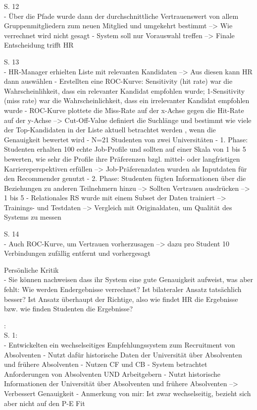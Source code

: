 S. 12\\
- Über die Pfade wurde dann der durchschnittliche Vertrauenswert von allem Gruppenmitgliedern zum neuen Mitglied und umgekehrt bestimmt --> Wie verrechnet wird nicht gesagt
- System soll nur Vorauswahl treffen --> Finale Entscheidung trifft HR

S. 13\\
- HR-Manager erhielten Liste mit relevanten Kandidaten --> Aus diesen kann HR dann auswählen
- Erstellten eine ROC-Kurve: Sensitivity (hit rate) war die Wahrscheinlihkeit, dass ein relevanter Kandidat empfohlen wurde; 1-Sensitivity (miss rate) war die Wahrscheinlichkeit, dass ein irrelevanter Kandidat empfohlen wurde
- ROC-Kurve plottete die Miss-Rate auf der x-Achse gegen die Hit-Rate auf der y-Achse --> Cut-Off-Value definiert die Suchlänge und bestimmt wie viele der Top-Kandidaten in der Liste aktuell betrachtet werden , wenn die Genauigkeit bewertet wird
- N=21 Studenten von zwei Universitäten
- 1. Phase: Studenten erhalten 100 echte Job-Profile und sollten auf einer Skala von 1 bis 5 bewerten, wie sehr die Profile ihre Präferenzen bzgl. mittel- oder langfristigen Karriereperspektiven erfüllen --> Job-Präferenzdaten wurden als Inputdaten für den Recommender genutzt
- 2. Phase: Studenten fügten Informationen über die Beziehungen zu anderen Teilnehmern hinzu --> Sollten Vertrauen ausdrücken --> 1 bis 5
- Relationales RS wurde mit einem Subset der Daten trainiert --> Trainings- und Testdaten --> Vergleich mit Originaldaten, um Qualität des Systems zu messen

S. 14\\
- Auch ROC-Kurve, um Vertrauen vorherzusagen --> dazu pro Student 10 Verbindungen zufällig entfernt und vorhergesagt

Persönliche Kritik\\
- Sie können nachweisen dass ihr System eine gute Genauigkeit aufweist, was aber fehlt: Wie werden Endergebnisse verrechnet? Ist bilateraler Ansatz tatsächlich besser? Ist Ansatz überhaupt der Richtige, also wie findet HR die Ergebnisse bzw. wie finden Studenten die Ergebnisse?

\textcite{ding:2016}:\\
S. 1:\\
- Entwickelten ein wechselseitiges Empfehlungssystem zum Recruitment von Absolventen
- Nutzt dafür historische Daten der Universität über Absolventen und frühere Absolventen
- Nutzen CF und CB
- System betrachtet Anforderungen von Absolventen UND Arbeitgebern
- Nutzt historische Informationen der Universität über Absolventen und frühere Absolventen --> Verbessert Genauigkeit
- Anmerkung von mir: Ist zwar wechselseitig, bezieht sich aber nicht auf den P-E Fit

